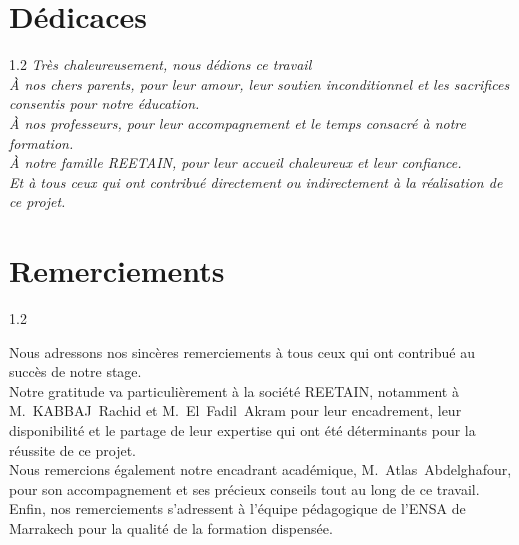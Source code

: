\documentclass[12pt,a4paper,openany,oneside,draft]{report}
\begin{document}
\chapter*{Dédicaces}
\thispagestyle{plain}
\begin{center}
    \vspace*{1cm}
    \large
    \begin{spacing}{1.2}
    \itshape
    Très chaleureusement, nous dédions ce travail\\[0.8em]
    
    À nos chers parents, pour leur amour, leur soutien inconditionnel et les sacrifices consentis pour notre éducation.\\[0.8em]
    
    À nos professeurs, pour leur accompagnement et le temps consacré à notre formation.\\[0.8em]
    
    À notre famille REETAIN, pour leur accueil chaleureux et leur confiance.\\[0.8em]
    
    Et à tous ceux qui ont contribué directement ou indirectement à la réalisation de ce projet.\\[0.8em]
    \end{spacing}
    \vspace*{1cm}
\end{center}

\chapter*{Remerciements}
\thispagestyle{plain}
\begin{center}
    \vspace*{0.5cm}
\end{center}

\begin{spacing}{1.2}
\large

Nous adressons nos sincères remerciements à tous ceux qui ont contribué au succès de notre stage.\\[0.5em]

Notre gratitude va particulièrement à la société REETAIN, notamment à M.~KABBAJ~Rachid et M.~El~Fadil~Akram pour leur encadrement, leur disponibilité et le partage de leur expertise qui ont été déterminants pour la réussite de ce projet.\\[0.5em]

Nous remercions également notre encadrant académique, M.~Atlas~Abdelghafour, pour son accompagnement et ses précieux conseils tout au long de ce travail.\\[0.5em]

Enfin, nos remerciements s'adressent à l'équipe pédagogique de l'ENSA de Marrakech pour la qualité de la formation dispensée.

\end{spacing}
\vspace*{0.5cm}
\end{document}
